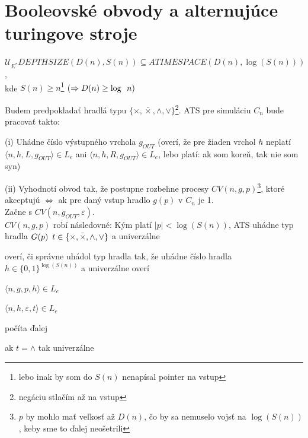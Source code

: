 \section{Booleovské obvody a alternujúce turingove stroje}

\begin{veta}\label{Veta3}
  $\mathcal{U}_{E^*} DEPTHSIZE(D(n),S(n))\subseteq ATIMESPACE(D(n),\log(S(n)))$,\\ kde
  $S(n)\geq n$\footnote{lebo inak by som do $S(n)$ nenapísal pointer na vstup}
  $(\Rightarrow D(n)\geq \log \enspace n)$
\end{veta}

\begin{dokaz}
  Budem predpokladať hradlá typu $\{\times, \bar{\times}, \wedge, \vee \}$\footnote{negáciu
  stlačím až na vstup}. ATS pre simuláciu $C_n$ bude pracovať takto:
  \begin{description}
    \item{(i) }Uhádne číslo výstupného vrchola $g_{OUT}$ (overí, že pre žiaden vrchol $h$
    neplatí $\langle n,h,L,g_{OUT} \rangle \in L_e$ ani $\langle n,h,R,g_{OUT} \rangle \in
    L_e$, lebo platí: ak som koreň, tak nie som syn)
    \item{(ii) }Vyhodnotí obvod tak, že postupne rozbehne procesy $CV(n,g,p)$\footnote{$p$ by
    mohlo mať veľkosť až $D(n)$, čo by sa nemuselo vojsť na $\log(S(n))$, keby sme to ďalej
    neošetrili}, ktoré akceptujú $\Leftrightarrow$ ak pre daný vstup hradlo $g(p)$ v $C_n$ je
    1.
    \\ Začne s $CV(n,g_{OUT},\varepsilon)$.\\ $CV(n,g,p)$ robí následovné: Kým platí
    $|p|<\log(S(n))$, ATS uhádne typ hradla $G(p)\enspace t\in
    \{\times,\bar{\times},\wedge,\vee\}$ a univerzálne
    \begin{enumerate}
    \item overí, či správne uhádol typ hradla tak, že uhádne číslo hradla
    $h\in\{0,1\}^{\log(S(n))}$ a univerzálne overí
    \begin{description}
    \item $\langle n,g,p,h\rangle\in L_e$
    \item $\langle n,h,\varepsilon,t \rangle \in L_e$
    \end{description}
    \item počíta ďalej
    \begin{description}
    \item ak $t=\wedge$ tak univerzálne
    \begin{description}

\end{description}
\end{description}
\end{enumerate}
\end{description}
\end{dokaz}
